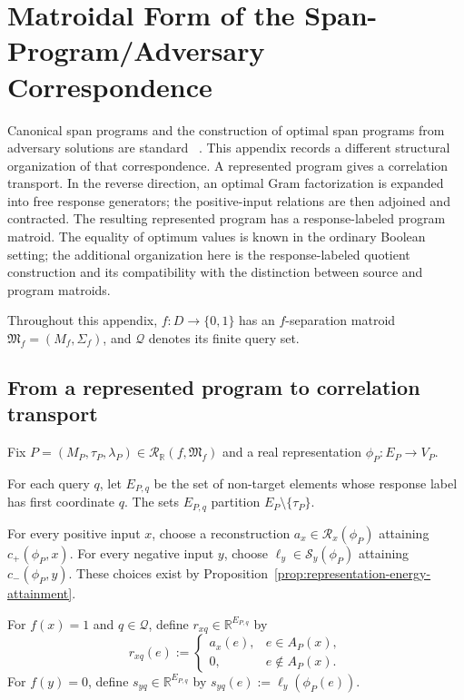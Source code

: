 \documentclass[11pt]{article}
\numberwithin{equation}{section}
\theoremstyle{remark}
\begin{document}
\section{Matroidal Form of the Span-Program/Adversary Correspondence}
\label{app:universal-normal-form}
\label{sec:matroid-span-program-optimality}
\label{sec:matroid-span-program-normal-forms}

Canonical span programs and the construction of optimal span programs from
adversary solutions are standard
~\cite{KarchmerWigderson1993,Reichardt2009,Reichardt2014Equivalent}. This
appendix records a different structural organization of that correspondence.
A represented program gives a correlation transport. In the reverse
direction, an optimal Gram factorization is expanded into free response
generators; the positive-input relations are then adjoined and contracted.
The resulting represented program has a response-labeled program matroid.
The equality of optimum values is known in the ordinary Boolean setting; the
additional organization here is the response-labeled quotient construction
and its compatibility with the distinction between source and program
matroids.

Throughout this appendix, $f:D\to\{0,1\}$ has an $f$-separation matroid
$\mathfrak M_f=(M_f,\Sigma_f)$, and $\mathcal Q$ denotes its finite query
set.

\subsection{From a represented program to correlation transport}
\label{subsec:program-to-correlation-transport}

Fix
$P=(M_P,\tau_P,\lambda_P)\in\mathscr R_{\mathbb R}(f,\mathfrak M_f)$
and a real representation $\phi_P:E_P\to V_P$.

For each query $q$, let $E_{P,q}$ be the set of non-target elements whose
response label has first coordinate $q$. The sets $E_{P,q}$ partition
$E_P\setminus\{\tau_P\}$.

For every positive input $x$, choose a reconstruction
$a_x\in\mathcal R_x(\phi_P)$ attaining
$c_+(\phi_P,x)$. For every negative input $y$, choose
$\ell_y\in\mathcal S_y(\phi_P)$ attaining
$c_-(\phi_P,y)$. These choices exist by
Proposition~\ref{prop:representation-energy-attainment}.

For $f(x)=1$ and $q\in\mathcal Q$, define
$r_{xq}\in\mathbb R^{E_{P,q}}$ by
\begin{equation}
    r_{xq}(e)
    :=
    \begin{cases}
        a_x(e),&e\in A_P(x),\\
        0,&e\notin A_P(x).
    \end{cases}
\end{equation}
For $f(y)=0$, define $s_{yq}\in\mathbb R^{E_{P,q}}$ by
$s_{yq}(e):=\ell_y(\phi_P(e))$.
\end{document}
